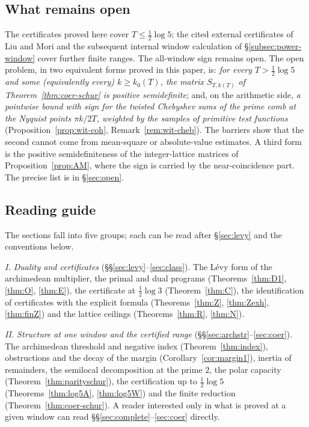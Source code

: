 \documentclass[11pt]{amsart}
\theoremstyle{definition}
\theoremstyle{remark}
\begin{document}
\subsection{What remains open}
The certificates proved here cover $T\le\frac12\log5$; the cited external certificates of
Liu and Mori and the subsequent internal window calculation of \S\ref{subsec:power-window} cover further
finite ranges. The all-window sign remains open. The open problem, in two equivalent forms proved in this paper, is: \emph{for every
$T>\frac12\log5$ and some (equivalently every) $k\ge k_0(T)$, the matrix $S_{T,k(T)}$ of
Theorem~\ref{thm:coer-schur} is positive semidefinite}; and, on the arithmetic side, \emph{a pointwise bound with
sign for the twisted Chebyshev sums of the prime comb at the Nyquist points $\pi k/2T$, weighted by the samples
of primitive test functions} (Proposition~\ref{prop:wit-coh}, Remark~\ref{rem:wit-cheb}). The barriers show that
the second cannot come from mean-square or absolute-value estimates. A third form is the positive semidefiniteness of the
integer-lattice matrices of Proposition~\ref{prop:AM}, where the sign is carried by the near-coincidence part. The precise
list is in \S\ref{sec:open}.

\subsection{Reading guide}
The sections fall into five groups; each can be read after \S\ref{sec:levy} and the conventions below.

\emph{I. Duality and certificates} (\S\S\ref{sec:levy}--\ref{sec:class}). The L\'evy form of the archimedean
multiplier, the primal and dual programs (Theorems~\ref{thm:D1}, \ref{thm:O}, \ref{thm:E}), the certificate at
$\frac12\log3$ (Theorem~\ref{thm:C}), the identification of certificates with the explicit formula
(Theorems~\ref{thm:Z}, \ref{thm:Zexh}, \ref{thm:finZ}) and the lattice ceilings (Theorems~\ref{thm:R}, \ref{thm:N}).

\emph{II. Structure at one window and the certified range} (\S\S\ref{sec:archstr}--\ref{sec:coer}). The archimedean
threshold and negative index (Theorem~\ref{thm:index}), obstructions and the decay of the margin
(Corollary~\ref{cor:margin1}), inertia of remainders, the semilocal decomposition at the prime $2$, the polar capacity
(Theorem~\ref{thm:parityschur}), the certification up to $\frac12\log5$ (Theorems~\ref{thm:log5A}, \ref{thm:log5W}) and
the finite reduction (Theorem~\ref{thm:coer-schur}). A reader interested only in what is proved at a given window can
read \S\S\ref{sec:complete}--\ref{sec:coer} directly.
\end{document}
